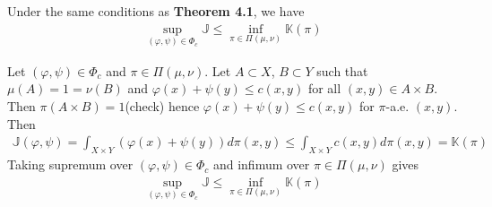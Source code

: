 \documentclass[12pt,a4paper]{article}
\newenvironment{proof}
{\begin{changemargin}{1cm}{0.5cm} 
	}%
	{\end{changemargin}
}
\newenvironment{p}
{\begin{proof} 
	}%
	{\end{proof}
}
\begin{document}
 Under the same conditions as \textbf{Theorem 4.1}, we have
\begin{align*}
\sup_{(\varphi, \psi)\in \Phi_c} \mathbb{J} \leq \inf_{\pi \in \Pi(\mu, \nu)} \mathbb{K}(\pi) 
\end{align*}
\begin{p}
\pf Let $(\varphi, \psi) \in \Phi_c$ and $\pi \in \Pi(\mu, \nu)$. Let $A\subset X$, $B\subset Y$ such that $\mu(A) = 1= \nu(B)$ and $\varphi(x) + \psi(y) \leq c(x,y)$ for all $(x,y)\in A\times B$. Then $\pi(A\times B) =1$(check) hence $\varphi(x) + \psi(y) \leq c(x,y)$ for $\pi$-a.e. $(x,y)$. Then
\begin{align*}
\mathbb{J}(\varphi, \psi) = \int_{X\times Y}(\varphi(x) + \psi(y)) d\pi(x,y) \leq \int_{X\times Y} c(x,y)d\pi(x,y) = \mathbb{K}(\pi)
\end{align*}
Taking supremum over $(\varphi, \psi) \in \Phi_c$ and infimum over $\pi \in \Pi(\mu, \nu)$ gives
\begin{align*}
\sup_{(\varphi, \psi)\in \Phi_c} \mathbb{J} \leq \inf_{\pi \in \Pi(\mu, \nu)} \mathbb{K}(\pi) 
\end{align*}
\eop
\end{p}
\s
\end{document}
